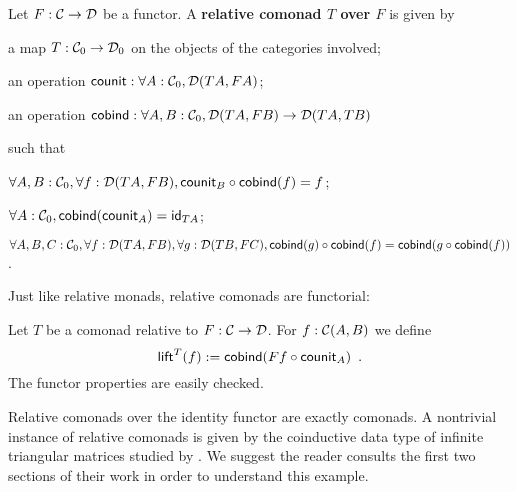 \documentclass[conference,10pt]{IEEEtran}
\newcommand{\fat}[1]{\textbf{#1}}
\begin{document}
\begin{definition}\label{def:rel_comonad}
  Let $F:\C\to\D$ be a functor. A \fat{relative comonad $T$ over $F$} is given by
  \begin{packitem}
   \item a map $T:\C_0 \to \D_0$ on the objects of the categories involved;
   \item an operation $\counit : \forall A : \C_0, \D(TA,FA)$;
   \item an operation $\cobind: \forall A,B:\C_0, \D(TA,FB) \to \D(TA,TB)$
  \end{packitem}
  such that 
  \begin{packitem}
   \item $\forall A,B:\C_0, \forall f:\D(TA,FB), \comp{\cobind(f)}{\counit_B} = f$;
   \item $\forall A : \C_0, \cobind(\counit_A) = \id_{TA}$;
   \item $\forall A,B,C:\C_0, \forall f : \D(TA,FB),\forall g:\D(TB,FC), \\
        \comp{\cobind(f)}{\cobind(g)} = \cobind(\comp{\cobind(f)}{g})$.
  \end{packitem} 
\end{definition}
Just like relative monads, relative comonads are functorial:
\begin{definition}\label{def:lift}
 Let $T$ be a  comonad relative to $F:\C\to\D$.
 For $f : \C(A,B)$ we define
  \[ \lift^T(f) := \cobind(\comp{\counit_A}{Ff}) \enspace .  \]
 The functor properties are easily checked.
\end{definition}
Relative comonads over the identity functor are exactly comonads.
A nontrivial instance of relative comonads is given by the coinductive data type of infinite triangular matrices
studied by \textcite{DBLP:conf/types/MatthesP11}. We suggest the reader consults the first two sections of their work
in order to understand this example.
\end{document}
